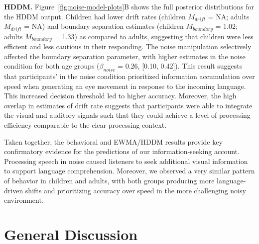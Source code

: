 \documentclass[english,floatsintext,man]{apa6}
\begin{document}
\textbf{HDDM.} Figure~\ref{fig:noise-model-plots}B shows the full
posterior distributions for the HDDM output. Children had lower drift
rates (children \(M_{drift}\) = NA; adults \(M_{drift}\) = NA) and
boundary separation estimates (children \(M_{boundary}\) = 1.02; adults
\(M_{boundary}\) = 1.33) as compared to adults, suggesting that children
were less efficient and less cautious in their responding. The noise
manipulation selectively affected the boundary separation parameter,
with higher estimates in the noise condition for both age groups
(\(\beta_{noise}\) = 0.26, {[}0.10, 0.42{]}). This result suggests that
participants' in the noise condition prioritized information
accumulation over speed when generating an eye movement in response to
the incoming language. This increased decision threshold led to higher
accuracy. Moreover, the high overlap in estimates of drift rate suggests
that participants were able to integrate the visual and auditory signals
such that they could achieve a level of processing efficiency comparable
to the clear processing context.

Taken together, the behavioral and EWMA/HDDM results provide key
confirmatory evidence for the predictions of our information-seeking
account. Processing speech in noise caused listeners to seek additional
visual information to support language comprehension. Moreover, we
observed a very similar pattern of behavior in children and adults, with
both groups producing more language-driven shifts and prioritizing
accuracy over speed in the more challenging noisy environment.

\hypertarget{general-discussion}{%
\section{General Discussion}\label{general-discussion}}
\end{document}
